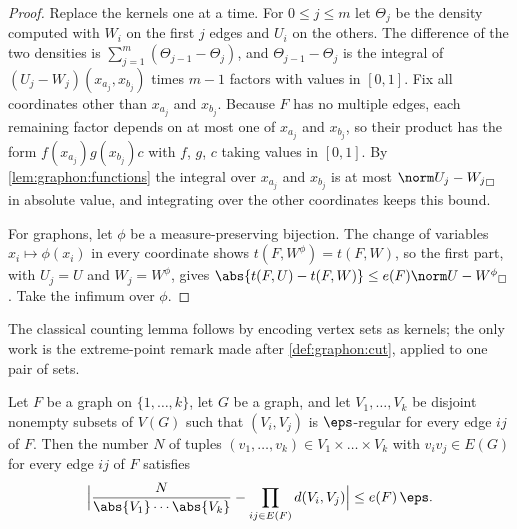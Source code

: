 \begin{refsection}
\begin{proof}
Replace the kernels one at a time. For $0\le j\le m$ let $\Theta_j$ be the density computed with $W_i$ on the first $j$ edges and $U_i$ on the others. The difference of the two densities is $\sum_{j=1}^m(\Theta_{j-1}-\Theta_j)$, and $\Theta_{j-1}-\Theta_j$ is the integral of $(U_j-W_j)(x_{a_j},x_{b_j})$ times $m-1$ factors with values in $[0,1]$. Fix all coordinates other than $x_{a_j}$ and $x_{b_j}$. Because $F$ has no multiple edges, each remaining factor depends on at most one of $x_{a_j}$ and $x_{b_j}$, so their product has the form $f(x_{a_j})g(x_{b_j})c$ with $f$, $g$, $c$ taking values in $[0,1]$. By \cref{lem:graphon:functions} the integral over $x_{a_j}$ and $x_{b_j}$ is at most $\graphoncut{U_j-W_j}$ in absolute value, and integrating over the other coordinates keeps this bound.

For graphons, let $\phi$ be a measure-preserving bijection. The change of variables $x_i\mapsto\phi(x_i)$ in every coordinate shows $t(F,W^\phi)=t(F,W)$, so the first part, with $U_j=U$ and $W_j=W^\phi$, gives $\abs{t(F,U)-t(F,W)}\le e(F)\graphoncut{U-W^\phi}$. Take the infimum over $\phi$.
\end{proof}

The classical counting lemma follows by encoding vertex sets as kernels; the only work is the extreme-point remark made after \cref{def:graphon:cut}, applied to one pair of sets.

\begin{corollary}\label{cor:graphon:count-regular}
Let $F$ be a graph on $\{1,\dots,k\}$, let $G$ be a graph, and let $V_1,\dots,V_k$ be disjoint nonempty subsets of $V(G)$ such that $(V_i,V_j)$ is $\eps$-regular for every edge $ij$ of $F$. Then the number $N$ of tuples $(v_1,\dots,v_k)\in V_1\times\dots\times V_k$ with $v_iv_j\in E(G)$ for every edge $ij$ of $F$ satisfies
\[
  \Bigl\lvert\frac{N}{\abs{V_1}\cdots\abs{V_k}}-\prod_{ij\in E(F)}d(V_i,V_j)\Bigr\rvert\le e(F)\,\eps .
\]
\end{corollary}


\end{refsection}
